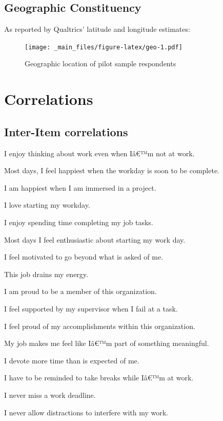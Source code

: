\documentclass[
]{book}
\begin{document}
\hypertarget{geo}{%
\section{Geographic Constituency}\label{geo}}

As reported by Qualtrics' latitude and longitude estimates:

\begin{figure}
\centering
\texttt{[image: \_main\_files/figure-latex/geo-1.pdf]}
\caption{\label{fig:geo}Geographic location of pilot sample respondents}
\end{figure}

\hypertarget{corrs}{%
\chapter{Correlations}\label{corrs}}

\hypertarget{inter-item-correlations}{%
\section{Inter-Item correlations}\label{inter-item-correlations}}

I enjoy thinking about work even when Iâ€™m not at work.

Most days, I feel happiest when the workday is soon to be complete.

I am happiest when I am immersed in a project.

I love starting my workday.

I enjoy spending time completing my job tasks.

Most days I feel enthusiastic about starting my work day.

I feel motivated to go beyond what is asked of me.

This job drains my energy.

I am proud to be a member of this organization.

I feel supported by my supervisor when I fail at a task.

I feel proud of my accomplishments within this organization.

My job makes me feel like Iâ€™m part of something meaningful.

I devote more time than is expected of me.

I have to be reminded to take breaks while Iâ€™m at work.

I never miss a work deadline.

I never allow distractions to interfere with my work.
\end{document}
